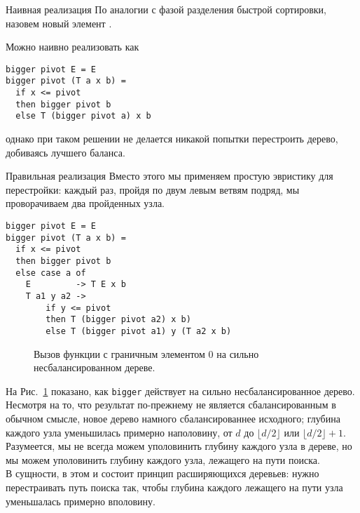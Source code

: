 \begin{frame}[fragile]{Наивная реализация }
По аналогии с фазой разделения быстрой сортировки,
назовем новый элемент .

Можно наивно реализовать  как

\begin{verbatim}
bigger pivot E = E
bigger pivot (T a x b) =
  if x <= pivot 
  then bigger pivot b
  else T (bigger pivot a) x b
\end{verbatim}
однако при таком решении не делается никакой попытки перестроить
дерево, добиваясь лучшего баланса.
\end{frame}

\begin{frame}[fragile]{Правильная реализация  }
Вместо этого мы применяем простую
эвристику для перестройки: каждый раз, пройдя по двум левым ветвям
подряд, мы проворачиваем два пройденных узла.

\begin{verbatim}
bigger pivot E = E
bigger pivot (T a x b) =
  if x <= pivot 
  then bigger pivot b
  else case a of
    E         -> T E x b
    T a1 y a2 ->
        if y <= pivot 
        then T (bigger pivot a2) x b)
        else T (bigger pivot a1) y (T a2 x b)
\end{verbatim} 
\end{frame}

\begin{frame}[fragile]{}
\begin{figure}
  \centering
  
  \caption{Вызов функции  с граничным элементом 0 на сильно несбалансированном дереве.}
  \label{fig:5.4}
\end{figure}


\end{frame}

\begin{frame}[fragile]{}
На Рис.~\ref{fig:5.4} показано, как \lstinline!bigger! действует на
сильно несбалансированное дерево. \\

Несмотря на то, что результат
по-прежнему не является сбалансированным в обычном смысле, новое
дерево намного сбалансированнее исходного; глубина каждого узла
уменьшилась примерно наполовину, от $d$ до $\lfloor d/2 \rfloor$ или
$\lfloor d/2 \rfloor + 1$.\\

Разумеется, мы не всегда можем уполовинить
глубину каждого узла в дереве, но мы можем уполовинить глубину каждого
узла, лежащего на пути поиска. \\

В сущности, в этом и состоит принцип
расширяющихся деревьев: нужно перестраивать путь поиска так, чтобы
глубина каждого лежащего на пути узла уменьшалась примерно вполовину.
\end{frame}

